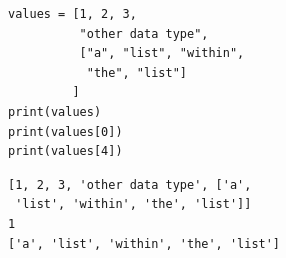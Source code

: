 \begin{frame}[fragile]
%
\begin{tcbraster}[raster columns=2,
                  raster equal height,
                  nobeforeafter,
                  raster column skip=0.5cm]
\begin{codebox}
\begin{verbatim}
values = [1, 2, 3, 
          "other data type", 
          ["a", "list", "within", 
           "the", "list"]
         ]
print(values)
print(values[0])
print(values[4])
\end{verbatim}
\end{codebox}
%
\begin{cmdbox}
\begin{verbatim}
[1, 2, 3, 'other data type', ['a', 
 'list', 'within', 'the', 'list']]
1
['a', 'list', 'within', 'the', 'list']
\end{verbatim}
\end{cmdbox}
\end{tcbraster}
%
\end{frame}


